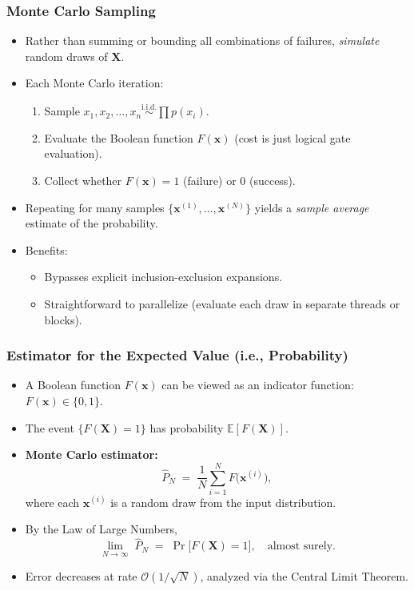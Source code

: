 \begin{frame}[t, allowframebreaks]
\frametitle{Monte Carlo Sampling}
\begin{itemize}
  \item Rather than summing or bounding all combinations of failures, \emph{simulate} random draws of \(\mathbf{X}\).
  \item Each Monte Carlo iteration:
    \begin{enumerate}
      \item Sample \(x_1, x_2,\dots,x_n \overset{\text{i.i.d.}}{\sim} \prod p(x_i)\).
      \item Evaluate the Boolean function \(F(\mathbf{x})\) (cost is just logical gate evaluation).
      \item Collect whether \(F(\mathbf{x})=1\) (failure) or 0 (success).
    \end{enumerate}
  \item Repeating for many samples \(\{\mathbf{x}^{(1)}, \dots, \mathbf{x}^{(N)}\}\) yields a \emph{sample average} estimate of the probability.
  \item Benefits:
    \begin{itemize}
      \item Bypasses explicit inclusion-exclusion expansions.
      \item Straightforward to parallelize (evaluate each draw in separate threads or blocks).
    \end{itemize}
\end{itemize}
\end{frame}

\begin{frame}[t, allowframebreaks]
\frametitle{Estimator for the Expected Value (i.e., Probability)}
\begin{itemize}
  \item A Boolean function \(F(\mathbf{x})\) can be viewed as an indicator function: \(F(\mathbf{x}) \in \{0,1\}\).
  \item The event \(\{F(\mathbf{X})=1\}\) has probability \(\mathbb{E}[F(\mathbf{X})]\).
  \item \textbf{Monte Carlo estimator:}
    \[
      \widehat{P}_N
      \;=\;
      \frac{1}{N}\sum_{i=1}^N 
      F\!\bigl(\mathbf{x}^{(i)}\bigr),
    \]
    where each \(\mathbf{x}^{(i)}\) is a random draw from the input distribution.
  \item By the Law of Large Numbers,
    \[
      \lim_{N \to \infty}\;\widehat{P}_N
      \;=\;
      \Pr\bigl[F(\mathbf{X})=1\bigr],
      \quad \text{almost surely}.
    \]
  \item Error decreases at rate \(\mathcal{O}(1/\sqrt{N})\), analyzed via the Central Limit Theorem.
\end{itemize}
\end{frame}


